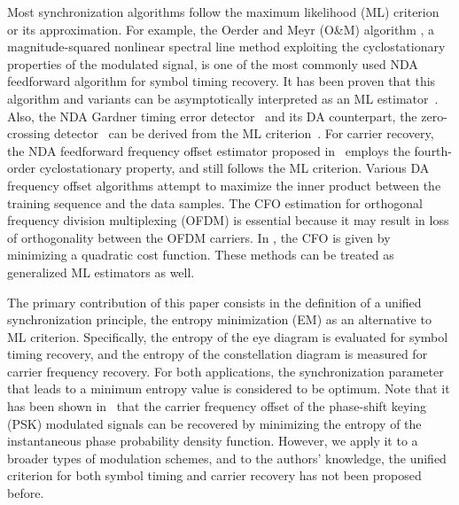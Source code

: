 \documentclass[journal,comsoc, onecolumn, 12pt,draftclsnofoot]{IEEEtran} %
\begin{document}
Most synchronization algorithms follow the maximum likelihood (ML) criterion or its approximation.
For example, the Oerder and Meyr (O\&M) algorithm \cite{Oerder1988}, a magnitude-squared nonlinear spectral line method exploiting the cyclostationary properties of the modulated signal, is one of the most commonly used NDA feedforward algorithm for symbol timing recovery.
It has been proven that this algorithm and variants can be asymptotically interpreted as an ML estimator~\cite{YanWang2002,Lopez-Salcedo2006}.
Also, the NDA Gardner timing error detector~\cite{Gardner1986} and its DA counterpart, the zero-crossing detector~\cite{gardner1988demodulator} can be derived from the ML criterion~\cite{Oerder1987}.
For carrier recovery, the NDA feedforward frequency offset estimator proposed in~\cite{Wang2004} employs the fourth-order cyclostationary property, and still follows the ML criterion.
Various DA frequency offset algorithms attempt to maximize the inner product between the  training sequence and the data samples.
The CFO estimation for orthogonal frequency division multiplexing (OFDM) is essential because it may result in loss of orthogonality between the OFDM carriers.
In  \cite{Li2006, Li2008, Amar2017LowCommunication},
% 
% 
the CFO is given by minimizing a quadratic cost function.
These methods can be treated as generalized ML estimators as well.

The primary contribution of this paper consists in the definition of a unified synchronization principle, the entropy minimization (EM) as an alternative to ML criterion. 
Specifically, the entropy of the eye diagram is evaluated for symbol timing recovery, and the entropy of the constellation diagram is measured for carrier frequency recovery.
For both applications, the synchronization parameter that leads to a minimum entropy value is considered to be optimum.
Note that it has been shown in~\cite{Pedzisz2006} that the carrier frequency offset of the phase-shift keying (PSK) modulated signals can be recovered by minimizing the entropy of the instantaneous phase probability density function.
However, we apply it to a broader  types of modulation schemes, and to the authors' knowledge,  the unified criterion for both symbol timing and carrier recovery has not been proposed before. 
\end{document}

